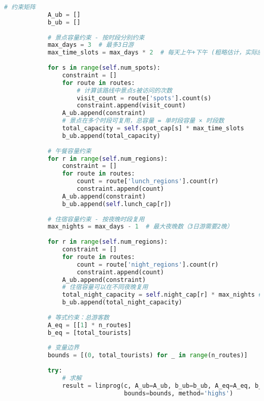 \begin{lstlisting}[language=Python]
            # 约束矩阵
            A_ub = []
            b_ub = []
            
            # 景点容量约束 - 按时段分别约束
            max_days = 3  # 最多3日游
            max_time_slots = max_days * 2  # 每天上午+下午 (粗略估计，实际应更精细，但为了简化模型，保持原逻辑)
            
            for s in range(self.num_spots):
                constraint = []
                for route in routes:
                    # 计算该路线中景点s被访问的次数
                    visit_count = route['spots'].count(s)
                    constraint.append(visit_count)
                A_ub.append(constraint)
                # 景点在多个时段可复用，总容量 = 单时段容量 × 时段数
                total_capacity = self.spot_cap[s] * max_time_slots
                b_ub.append(total_capacity)
            
            # 午餐容量约束
            for r in range(self.num_regions):
                constraint = []
                for route in routes:
                    count = route['lunch_regions'].count(r)
                    constraint.append(count)
                A_ub.append(constraint)
                b_ub.append(self.lunch_cap[r])
            
            # 住宿容量约束 - 按夜晚时段复用
            max_nights = max_days - 1  # 最大夜晚数（3日游需要2晚）
            
            for r in range(self.num_regions):
                constraint = []
                for route in routes:
                    count = route['night_regions'].count(r)
                    constraint.append(count)
                A_ub.append(constraint)
                # 住宿容量可以在不同夜晚复用
                total_night_capacity = self.night_cap[r] * max_nights # 使用 self.night_cap
                b_ub.append(total_night_capacity)
            
            # 等式约束：总游客数
            A_eq = [[1] * n_routes]
            b_eq = [total_tourists]
            
            # 变量边界
            bounds = [(0, total_tourists) for _ in range(n_routes)]
            
            try:
                # 求解
                result = linprog(c, A_ub=A_ub, b_ub=b_ub, A_eq=A_eq, b_eq=b_eq, 
                                 bounds=bounds, method='highs')
                

\end{lstlisting}

